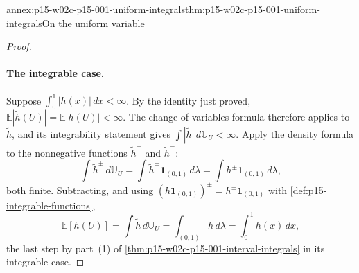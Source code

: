 \begin{annexitem}{annex:p15-w02c-p15-001-uniform-integrals}{thm:p15-w02c-p15-001-uniform-integrals}{On the uniform variable}
\begin{proof}
\paragraph{The integrable case.}
Suppose \(\int_0^1|h(x)|\,dx<\infty\). By the identity just proved,
\(\mathbb E|\tilde h(U)|=\mathbb E|h(U)|<\infty\). The change of
variables formula therefore applies to \(\tilde h\), and its integrability
statement gives \(\int|\tilde h|\,d\mathbb U_U<\infty\). Apply the density
formula to the nonnegative functions \(\tilde h^+\) and \(\tilde h^-\):
\[
 \int\tilde h^\pm\,d\mathbb U_U=\int\tilde h^\pm\mathbf1_{(0,1)}\,d\lambda
 =\int h^\pm\mathbf1_{(0,1)}\,d\lambda ,
\]
both finite. Subtracting, and using
\((h\mathbf1_{(0,1)})^\pm=h^\pm\mathbf1_{(0,1)}\) with
\cref{def:p15-integrable-functions},
\[
 \mathbb E[h(U)]=\int\tilde h\,d\mathbb U_U=\int_{(0,1)}h\,d\lambda
 =\int_0^1h(x)\,dx,
\]
the last step by part~(1) of
\cref{thm:p15-w02c-p15-001-interval-integrals} in its integrable case.
\end{proof}
\end{annexitem}

